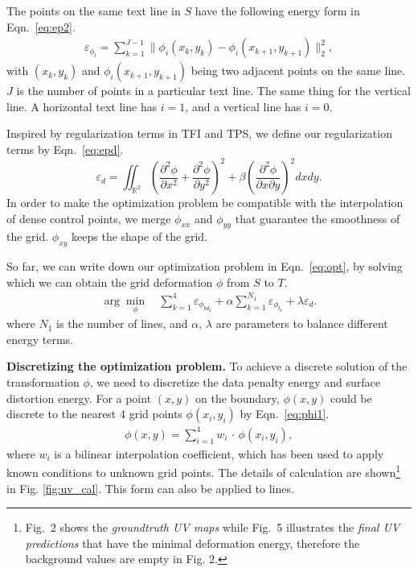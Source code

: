 \documentclass[10pt,twocolumn,letterpaper]{article}
\newcommand{\myparagraph}[1]{\vspace{1pt} \noindent \textbf{#1} }
\begin{document}
The points on the same text line in $S$ have the following energy form in Eqn.~\eqref{eq:ep2}. 
\begin{align}
  \varepsilon_{\phi_{l}}= \sum_{k=1}^{J-1} \lVert \phi_{i}(x_{k},y_{k})-\phi_{i}(x_{k+1},y_{k+1})\rVert_{2}^{2},
  \label{eq:ep2}
\end{align}
with $(x_{k},y_{k})$ and $\phi_{i}(x_{k+1},y_{k+1})$ being two adjacent points on the same line. $J$ is the number of points in a particular text line. The same thing for the vertical line. A horizontal text line has $i = 1$, and a vertical line has $i = 0$.

Inspired by regularization terms in TFI and TPS, we define our regularization terms by Eqn.~\eqref{eq:epd}. 
\begin{equation}
  \varepsilon_{d}= \iint_{\mathbb{R}^{2}}(\frac{\partial^{2} \phi }{\partial x^{2}}+\frac{\partial^{2} \phi }{\partial y^{2}})^{2}+\beta(\frac{\partial^{2} \phi }{\partial x\partial y})^{2}dxdy.
  \label{eq:epd}
\end{equation}
In order to make the optimization problem be compatible with the interpolation of dense control points, we merge $\phi_{xx}$ and $\phi_{yy}$ that guarantee the smoothness of the grid. $\phi_{xy}$ keeps the shape of the grid.  

So far, we can write down our optimization problem in Eqn.~\eqref{eq:opt}, by solving which we can obtain the grid deformation $\phi$ from $S$ to $T$.
\begin{equation}
  \begin{aligned}
  \arg \min_{\phi} \, & \sum_{k=1}^{4}\varepsilon_{\phi_{bd_{k}}} +\alpha\sum_{k=1}^{N_{1}}\varepsilon_{\phi_{l_{k}}} + \lambda \varepsilon_{d}.
  \end{aligned}
  \label{eq:opt}
\end{equation}
where $N_1$ is the number of lines, and $\alpha$, $\lambda$ are parameters to balance different energy terms.

\myparagraph{Discretizing the optimization problem.}
To achieve a discrete solution of the transformation $\phi$, we need to discretize the data penalty energy and surface distortion energy. For a point $(x,y)$ on the boundary, $\phi(x,y)$ could be discrete to the nearest 4 grid points $\phi(x_{i},y_{i})$ by Eqn.~\eqref{eq:phi1}. 
\begin{equation}
\begin{aligned}
  \phi(x,y) = \sum_{i=1}^{4} w_{i}\,\cdot\,\phi(x_{i},y_{i}),
 \end{aligned}
  \label{eq:phi1}
\end{equation}
where $w_{i}$ is a bilinear interpolation coefficient, which has been used to apply known conditions to unknown grid points. The details of calculation are shown\footnote{Fig.~2 shows the \textit{groundtruth UV maps} while Fig.~5 illustrates the \textit{final UV predictions} that have the minimal deformation energy, therefore the background values are empty in Fig. 2.} in Fig. \ref{fig:uv_cal}. This form can also be applied to lines.
\end{document}
